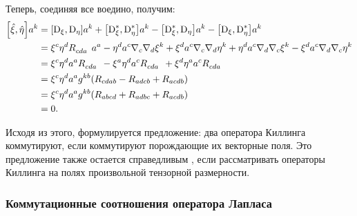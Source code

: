 \documentclass[12pt,a4paper]{article}
\begin{document}
                Теперь, соединяя все воедино, получим:
                \begin{equation}\begin{aligned}
                    \comm{\Op{\xi}}{\Op{\eta}} a^k
                        &= \comm{\D_\xi}{\D_\eta} a^k
                        + \comm{\D^{*}_\xi}{\D^{*}_\eta} a^k
                        - \comm{\D^{*}_\xi}{\D_\eta} a^k
                        - \comm{\D_\xi}{\D^{*}_\eta} a^k \\
                        &= \xi^c \eta^d R_{cda}^{\hphantom{cdak}} a^a
                        - \eta^d a^c \nabla_c \nabla_d \xi^k
                        + \xi^d a^c \nabla_c \nabla_d \eta^k
                        + \eta^d a^c \nabla_d \nabla_c \xi^k
                        - \xi^d a^c \nabla_d \nabla_c \eta^k \\
                        &= \xi^c \eta^d a^a R_{cda}^{\hphantom{cdak}}
                        - \xi^a \eta^d a^c R_{cda}^{\hphantom{cdak}}
                        + \xi^d \eta^a a^c R_{cda}^{\hphantom{cdak}} \\
                        &= \xi^c \eta^d a^a g^{kb} \qty(
                            R_{cdab} - R_{adcb} + R_{acdb}
                        ) \\
                        &= \xi^c \eta^d a^a g^{kb} \qty(
                            R_{abcd} + R_{adbc} + R_{acdb}
                        ) \\
                        &= 0 .
                \end{aligned}\end{equation}

                Исходя из этого, формулируется предложение: два оператора Киллинга коммутируют, если коммутируют порождающие их векторные поля. Это предложение также остается справедливым \cite{burlankov_space_dynamics}, если рассматривать операторы Киллинга на полях произвольной тензорной размерности.


            \subsubsection{Коммутационные соотношения оператора Лапласа}
\end{document}
